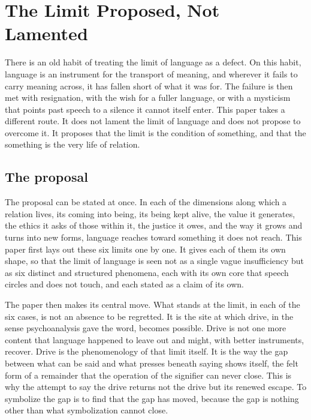 \section{The Limit Proposed, Not Lamented}
\label{p26:sec:intro}

\noindent
There is an old habit of treating the limit of language as a defect. On this habit, language is an instrument for the transport of meaning, and wherever it fails to carry meaning across, it has fallen short of what it was for. The failure is then met with resignation, with the wish for a fuller language, or with a mysticism that points past speech to a silence it cannot itself enter. This paper takes a different route. It does not lament the limit of language and does not propose to overcome it. It proposes that the limit is the condition of something, and that the something is the very life of relation.

\subsection*{The proposal}

The proposal can be stated at once. In each of the dimensions along which a relation lives, its coming into being, its being kept alive, the value it generates, the ethics it asks of those within it, the justice it owes, and the way it grows and turns into new forms, language reaches toward something it does not reach. This paper first lays out these six limits one by one. It gives each of them its own shape, so that the limit of language is seen not as a single vague insufficiency but as six distinct and structured phenomena, each with its own core that speech circles and does not touch, and each stated as a claim of its own.

The paper then makes its central move. What stands at the limit, in each of the six cases, is not an absence to be regretted. It is the site at which drive, in the sense psychoanalysis gave the word, becomes possible. Drive is not one more content that language happened to leave out and might, with better instruments, recover. Drive is the phenomenology of that limit itself. It is the way the gap between what can be said and what presses beneath saying shows itself, the felt form of a remainder that the operation of the signifier can never close. This is why the attempt to say the drive returns not the drive but its renewed escape. To symbolize the gap is to find that the gap has moved, because the gap is nothing other than what symbolization cannot close.


